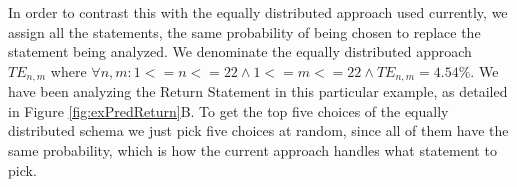 \documentclass[conference]{IEEEtran}
\begin{document}

In order to contrast this with the equally distributed approach used currently, 
we assign all the statements, the same probability of being chosen to replace 
the statement being analyzed. We denominate the equally distributed approach 
$TE_{n,m}$ where $\forall n,m: 1<=n<=22 \land 1<=m<=22 \land TE_{n,m} = 4.54\%$. 
We have been analyzing the Return Statement in this particular example, as 
detailed in Figure \ref{fig:exPredReturn}B. To get the top five choices of the 
equally distributed schema we just pick five choices at random, since all of 
them have the same probability, which is how the current approach handles what 
statement to pick.


\end{document}

